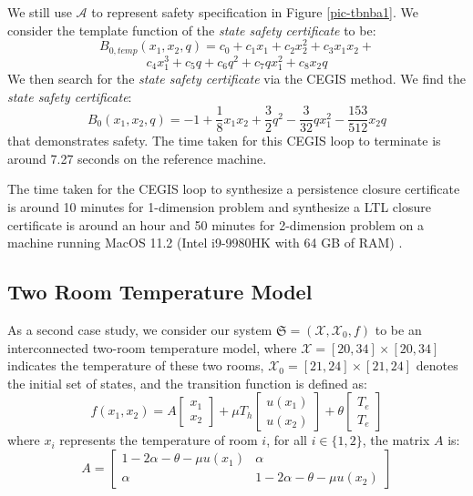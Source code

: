 \documentclass[acmlarge]{acmart}
\begin{document}
We still use $\mathcal{A}$ to represent safety specification in Figure \ref{pic-tbnba1}.
We consider the template function of the \emph{state safety certificate} to be:
$$B_{0,temp}(x_1, x_2, q) = c_0 + c_1x_1 + c_2x_2^2 + c_3x_1x_2 + $$
$$c_4x_1^3 + c_5q + c_6q^2 + c_7qx_1^2 + c_8x_2q$$
We then search for the \emph{state safety certificate} via the CEGIS method. 
We find the \emph{state safety certificate}: $$B_0(x_1, x_2, q) = -1 +  \frac{1}{8}x_1x_2 + \frac{3}{2}q^2 - \frac{3}{32}qx_1^2 - \frac{153}{512}x_2q$$ that demonstrates safety. 
The time taken for this CEGIS loop to terminate is around 7.27 seconds on the reference machine. 

The time taken for the CEGIS loop to synthesize a persistence closure certificate is around 10 minutes for 1-dimension problem and synthesize a LTL closure certificate is around an hour and 50 minutes for 2-dimension problem on a machine running MacOS 11.2 (Intel i9-9980HK with 64 GB of RAM) \cite{murali2024closure}.

\subsection{Two Room Temperature Model}
As a second case study, we consider our system $\mathfrak{S} = (\mathcal{X}, \mathcal{X}_0, f)$ to be
an interconnected two-room temperature model, where $\mathcal{X} = [20, 34] \times [20, 34]$ indicates the temperature of these two rooms, $\mathcal{X}_0 = [21, 24] \times [21, 24]$ denotes the initial set of states, and the transition function is defined as:
$$
f(x_1, x_2) = A 
\begin{bmatrix}
  x_1 \\
  x_2
\end{bmatrix}
+\mu T_h 
\begin{bmatrix}
  u(x_1) \\
  u(x_2)
\end{bmatrix}
+
\theta
\begin{bmatrix}
  T_e \\ 
  T_e
\end{bmatrix}
$$
where $x_i$ represents the temperature of room $i$, for all $i \in \{1, 2\}$, the
matrix $A$ is:
$$
A = 
\begin{bmatrix}
  1 - 2\alpha - \theta - \mu u(x_1) & \alpha \\
  \alpha & 1 - 2\alpha - \theta - \mu u(x_2)
\end{bmatrix}
$$ 
\end{document}
